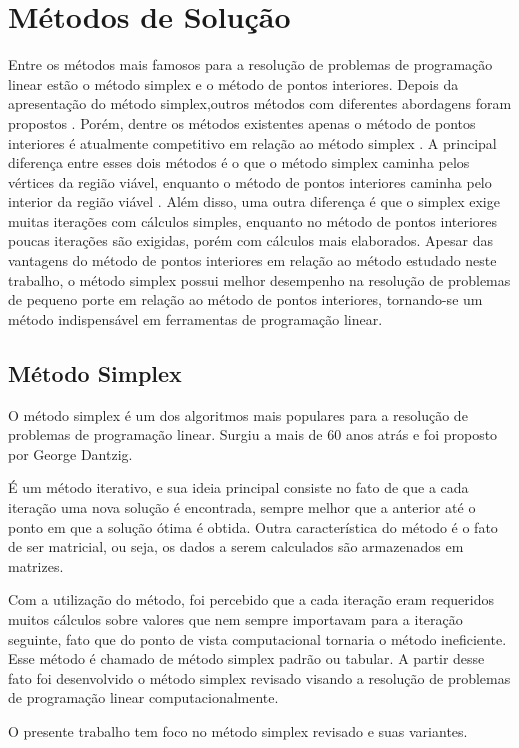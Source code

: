 \section{Métodos de Solução}
Entre os métodos mais famosos para a resolução de problemas de programação linear estão o método simplex  e o método de pontos interiores. 
Depois da apresentação do método simplex,outros métodos com diferentes abordagens foram propostos \cite{Todd}. Porém, dentre os métodos existentes apenas o método de pontos interiores é atualmente competitivo em relação ao método simplex . 
A principal diferença entre esses dois métodos é o que o método simplex caminha pelos vértices da região viável, enquanto o método de pontos interiores caminha pelo interior da região viável \cite{MaculanPI}. Além disso, uma outra diferença é que o simplex exige muitas iterações com cálculos simples, enquanto no método de pontos interiores poucas iterações são exigidas, porém com cálculos mais elaborados.
Apesar das vantagens do método de pontos interiores em relação ao método estudado neste trabalho, o método simplex possui melhor desempenho na resolução de problemas de pequeno porte em relação ao método de pontos interiores, tornando-se um método indispensável em ferramentas de programação linear.

\subsection{Método Simplex}
O método simplex é um dos algoritmos mais populares para a resolução de problemas de programação linear. Surgiu a mais de 60 anos atrás e foi proposto por George Dantzig.  

É um método iterativo, e sua ideia principal consiste no fato de que a cada iteração uma nova solução é encontrada, sempre melhor que a anterior até o ponto em que a solução ótima é obtida. Outra característica do método é o fato de ser matricial, ou seja, os dados a serem calculados são armazenados em matrizes.  

Com a utilização do método, foi percebido que a cada iteração eram requeridos muitos cálculos sobre valores que nem sempre importavam para a iteração seguinte, fato que do ponto de vista computacional tornaria o método ineficiente. Esse método é chamado de método simplex padrão ou tabular. A partir desse fato foi desenvolvido o método simplex revisado visando a resolução de problemas de programação linear computacionalmente.

O presente trabalho tem foco no método simplex revisado e suas variantes.

